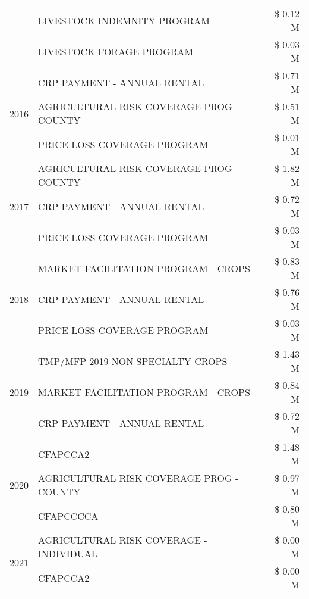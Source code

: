 \begin{tabular}{llr}
 & LIVESTOCK INDEMNITY PROGRAM & \$ 0.12 M \\
 & LIVESTOCK FORAGE PROGRAM & \$ 0.03 M \\
\cline{1-3}
\multirow[t]{3}{*}{2016} & CRP PAYMENT - ANNUAL RENTAL                   & \$ 0.71 M \\
 & AGRICULTURAL RISK COVERAGE PROG - COUNTY      & \$ 0.51 M \\
 & PRICE LOSS COVERAGE PROGRAM                   & \$ 0.01 M \\
\cline{1-3}
\multirow[t]{3}{*}{2017} & AGRICULTURAL RISK COVERAGE PROG - COUNTY & \$ 1.82 M \\
 & CRP PAYMENT - ANNUAL RENTAL & \$ 0.72 M \\
 & PRICE LOSS COVERAGE PROGRAM & \$ 0.03 M \\
\cline{1-3}
\multirow[t]{3}{*}{2018} & MARKET FACILITATION PROGRAM - CROPS & \$ 0.83 M \\
 & CRP PAYMENT - ANNUAL RENTAL & \$ 0.76 M \\
 & PRICE LOSS COVERAGE PROGRAM & \$ 0.03 M \\
\cline{1-3}
\multirow[t]{3}{*}{2019} & TMP/MFP 2019 NON SPECIALTY CROPS & \$ 1.43 M \\
 & MARKET FACILITATION PROGRAM - CROPS & \$ 0.84 M \\
 & CRP PAYMENT - ANNUAL RENTAL & \$ 0.72 M \\
\cline{1-3}
\multirow[t]{3}{*}{2020} & CFAPCCA2 & \$ 1.48 M \\
 & AGRICULTURAL RISK COVERAGE PROG - COUNTY & \$ 0.97 M \\
 & CFAPCCCCA & \$ 0.80 M \\
\cline{1-3}
\multirow[t]{2}{*}{2021} & AGRICULTURAL RISK COVERAGE - INDIVIDUAL & \$ 0.00 M \\
 & CFAPCCA2 & \$ 0.00 M \\
\cline{1-3}
\bottomrule
\end{tabular}
